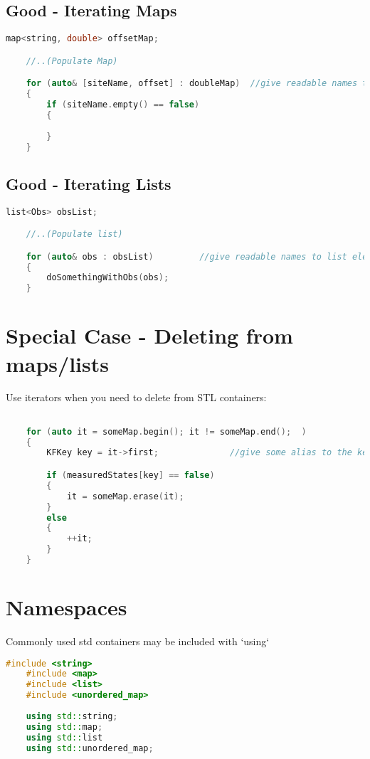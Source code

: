 \subsection{Good - Iterating Maps}
\begin{lstlisting}[language=c++]
    map<string, double> offsetMap;

    //..(Populate Map)

    for (auto& [siteName, offset] : doubleMap)	//give readable names to map keys and values
    {
        if (siteName.empty() == false)
        {
        
        }
    }
\end{lstlisting}
\subsection{ Good - Iterating Lists}
\begin{lstlisting}[language=c++]
    list<Obs> obsList;

    //..(Populate list)

    for (auto& obs : obsList)         //give readable names to list elements
    {
        doSomethingWithObs(obs);
    }
\end{lstlisting}

\section{Special Case - Deleting from maps/lists}

Use iterators when you need to delete from STL containers:
\begin{lstlisting}[language=c++]

    for (auto it = someMap.begin(); it != someMap.end();  )
    {
        KFKey key = it->first;				//give some alias to the key/value so they're readable

        if (measuredStates[key] == false)
        {
	    	it = someMap.erase(it);
    	}
	    else
	    {
	    	++it;
    	}
    }
\end{lstlisting}
\section{Namespaces}

Commonly used std containers may be included with `using`
\begin{lstlisting}[language=c++]
    #include <string>
    #include <map>
    #include <list>
    #include <unordered_map>
    
    using std::string;
    using std::map;
    using std::list
    using std::unordered_map;
\end{lstlisting}
